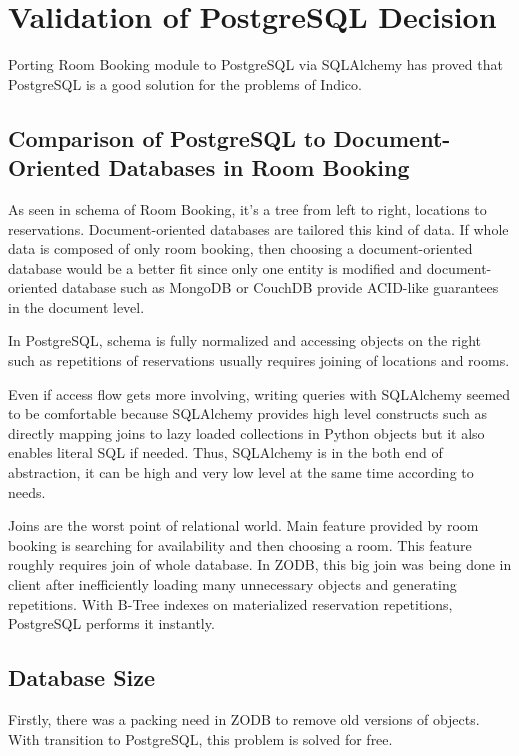 \chapter{Validation of PostgreSQL Decision}

Porting Room Booking module to PostgreSQL via SQLAlchemy has proved that PostgreSQL is a good solution for the problems of Indico.

\section{Comparison of PostgreSQL to Document-Oriented Databases in Room Booking}

As seen in schema of Room Booking, it's a tree from left to right, locations to reservations. Document-oriented databases are tailored this kind of data. If whole data is composed of only room booking, then choosing a document-oriented database would be a better fit since only one entity is modified and document-oriented database such as MongoDB or CouchDB provide ACID-like guarantees in the document level.

In PostgreSQL, schema is fully normalized and accessing objects on the right such as repetitions of reservations usually requires joining of locations and rooms. 

Even if access flow gets more involving, writing queries with SQLAlchemy seemed to be comfortable because SQLAlchemy provides high level constructs such as directly mapping joins to lazy loaded collections in Python objects but it also enables literal SQL if needed. Thus, SQLAlchemy is in the both end of abstraction, it can be high and very low level at the same time according to needs.

Joins are the worst point of relational world. Main feature provided by room booking is searching for availability and then choosing a room. This feature roughly requires join of whole database. In ZODB, this big join was being done in client after inefficiently loading many unnecessary objects and generating repetitions. With B-Tree indexes on materialized reservation repetitions, PostgreSQL performs it instantly.

\section{Database Size}

Firstly, there was a packing need in ZODB to remove old versions of objects. With transition to PostgreSQL, this problem is solved for free.

